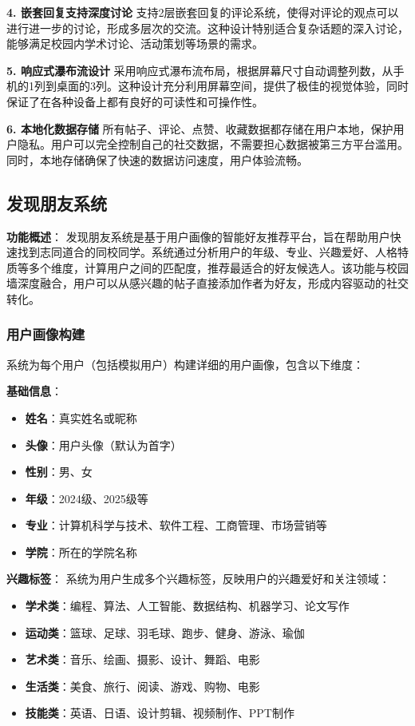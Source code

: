 \documentclass[12pt,a4paper]{article}
\begin{document}
\textbf{4. 嵌套回复支持深度讨论}
支持2层嵌套回复的评论系统，使得对评论的观点可以进行进一步的讨论，形成多层次的交流。这种设计特别适合复杂话题的深入讨论，能够满足校园内学术讨论、活动策划等场景的需求。

\textbf{5. 响应式瀑布流设计}
采用响应式瀑布流布局，根据屏幕尺寸自动调整列数，从手机的1列到桌面的3列。这种设计充分利用屏幕空间，提供了极佳的视觉体验，同时保证了在各种设备上都有良好的可读性和可操作性。

\textbf{6. 本地化数据存储}
所有帖子、评论、点赞、收藏数据都存储在用户本地，保护用户隐私。用户可以完全控制自己的社交数据，不需要担心数据被第三方平台滥用。同时，本地存储确保了快速的数据访问速度，用户体验流畅。

\subsection{发现朋友系统}

\textbf{功能概述}：
发现朋友系统是基于用户画像的智能好友推荐平台，旨在帮助用户快速找到志同道合的同校同学。系统通过分析用户的年级、专业、兴趣爱好、人格特质等多个维度，计算用户之间的匹配度，推荐最适合的好友候选人。该功能与校园墙深度融合，用户可以从感兴趣的帖子直接添加作者为好友，形成内容驱动的社交转化。

\subsubsection{用户画像构建}

系统为每个用户（包括模拟用户）构建详细的用户画像，包含以下维度：

\textbf{基础信息}：
\begin{itemize}
    \item \textbf{姓名}：真实姓名或昵称
    \item \textbf{头像}：用户头像（默认为首字）
    \item \textbf{性别}：男、女
    \item \textbf{年级}：2024级、2025级等
    \item \textbf{专业}：计算机科学与技术、软件工程、工商管理、市场营销等
    \item \textbf{学院}：所在的学院名称
\end{itemize}

\textbf{兴趣标签}：
系统为用户生成多个兴趣标签，反映用户的兴趣爱好和关注领域：

\begin{itemize}
    \item \textbf{学术类}：编程、算法、人工智能、数据结构、机器学习、论文写作
    \item \textbf{运动类}：篮球、足球、羽毛球、跑步、健身、游泳、瑜伽
    \item \textbf{艺术类}：音乐、绘画、摄影、设计、舞蹈、电影
    \item \textbf{生活类}：美食、旅行、阅读、游戏、购物、电影
    \item \textbf{技能类}：英语、日语、设计剪辑、视频制作、PPT制作
\end{itemize}
\end{document}
